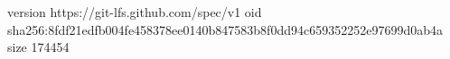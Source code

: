 version https://git-lfs.github.com/spec/v1
oid sha256:8fdf21edfb004fe458378ee0140b847583b8f0dd94c659352252e97699d0ab4a
size 174454

